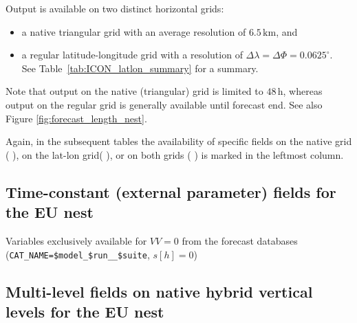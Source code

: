 Output is available on two distinct horizontal grids: 
\begin{itemize}
  \item a native triangular grid with an average resolution of $6.5\,\mathrm{km}$, and
  \item a regular latitude-longitude grid with a resolution of $\Delta \lambda = \Delta \Phi=0.0625^{\circ}$.\\
    See Table~\ref{tab:ICON_latlon_summary} for a summary.
\end{itemize}
%
Note that output on the native (triangular) grid is limited to $48\,\mathrm{h}$, whereas output on the regular 
grid is generally available until forecast end. See also Figure \ref{fig:forecast_length_nest}.

Again, in the subsequent tables the availability of specific fields on the native grid ($\,$\markRed$\,$), 
on the lat-lon grid($\,$\markBlue$\,$), or on both grids ($\,$\markRed\markBlue$\,$) is marked in the leftmost column.



\subsection{Time-constant (external parameter) fields for the EU nest}

\renewcommand{\onlyglb}[1]{}
\renewcommand{\onlyloc}[1]{#1}
%
\begin{vartable}{\caption{Variables exclusively available for $VV=0$ from the forecast databases (\texttt{CAT\_NAME=\$model\_\$run\_\_\$suite}, $s[h]=0$)}\label{table:nest:init_output}}

  

\end{vartable}


\subsection{Multi-level fields on native hybrid vertical levels for the EU nest}


